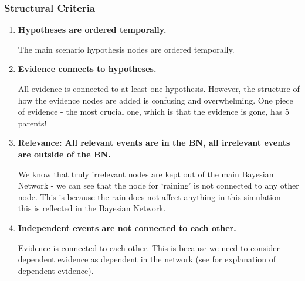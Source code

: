 \subsubsection{Structural Criteria}
\begin{enumerate}
\item \textbf{Hypotheses are ordered temporally.}

The main scenario hypothesis nodes are ordered temporally.

\item \textbf{Evidence connects to hypotheses.}

All evidence is connected to at least one hypothesis. However, the structure of how the evidence nodes are added is confusing and overwhelming. One piece of evidence - the most crucial one, which is that the evidence is gone, has 5 parents!

\item \textbf{Relevance: All relevant events are in the BN, all irrelevant events are outside of the BN.}

We know that truly irrelevant nodes are kept out of the main Bayesian Network - we can see that the node for `raining' is not connected to any other node. This is because the rain does not affect anything in this simulation - this is reflected in the Bayesian Network.

\item \textbf{Independent events are not connected to each other.}

Evidence is connected to each other. This is because we need to consider dependent evidence as dependent in the network (see \citep{Fenton2012} for explanation of dependent evidence).

\end{enumerate}


